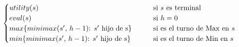 \documentclass[preview]{standalone}
\begin{document}
\begin{align*}
\begin{cases}
                                 utility(s) \qquad &\text{si $s$ es terminal} \cr
                                 eval(s) \qquad &\text{si $h = 0$} \cr
                                 max\{minimax(\text{$s'$, $h-1$): $s'$ hijo de }$s$\}\qquad &\text{si es el turno de Max en $s$} \cr
                                 min\{minimax(\text{$s'$, $h-1$): $s'$ hijo de }$s$\}\qquad &\text{si es el turno de Min en $s$} \cr
                                 \end{cases}
\end{align*}
\end{document}
